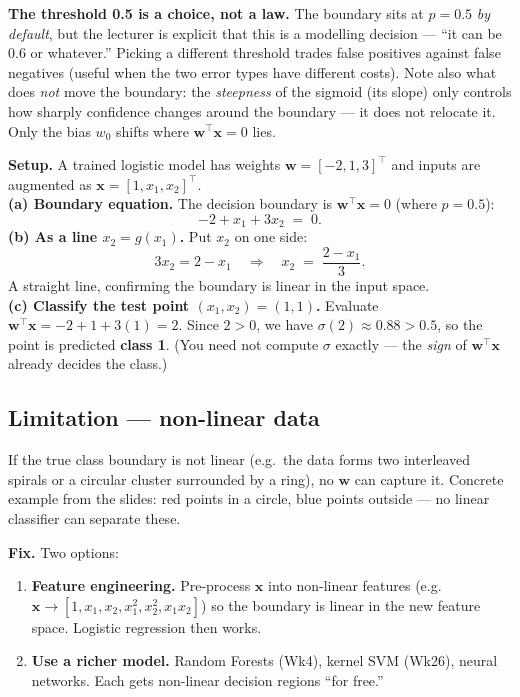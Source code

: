 \documentclass[11pt, a4paper]{article}
\begin{document}
\textbf{The threshold 0.5 is a choice, not a law.} The boundary sits at $p = 0.5$ \emph{by default}, but the lecturer is explicit that this is a modelling decision — ``it can be 0.6 or whatever.'' Picking a different threshold trades false positives against false negatives (useful when the two error types have different costs). Note also what does \emph{not} move the boundary: the \emph{steepness} of the sigmoid (its slope) only controls how sharply confidence changes around the boundary — it does not relocate it. Only the bias $w_0$ shifts where $\mathbf{w}^\top\mathbf{x} = 0$ lies.

\begin{exbox}
\textbf{Setup.} A trained logistic model has weights $\mathbf{w} = [-2, 1, 3]^\top$ and inputs are augmented as $\mathbf{x} = [1, x_1, x_2]^\top$.\\[0.2em]
\textbf{(a) Boundary equation.} The decision boundary is $\mathbf{w}^\top\mathbf{x} = 0$ (where $p = 0.5$):
\[
-2 + x_1 + 3x_2 \;=\; 0.
\]
\textbf{(b) As a line $x_2 = g(x_1)$.} Put $x_2$ on one side:
\[
3x_2 = 2 - x_1 \quad\Longrightarrow\quad x_2 \;=\; \frac{2 - x_1}{3}.
\]
A straight line, confirming the boundary is linear in the input space.\\[0.2em]
\textbf{(c) Classify the test point $(x_1, x_2) = (1, 1)$.} Evaluate $\mathbf{w}^\top\mathbf{x} = -2 + 1 + 3(1) = 2$. Since $2 > 0$, we have $\sigma(2) \approx 0.88 > 0.5$, so the point is predicted \textbf{class 1}. (You need not compute $\sigma$ exactly — the \emph{sign} of $\mathbf{w}^\top\mathbf{x}$ already decides the class.)
\end{exbox}

\subsection{Limitation — non-linear data}

If the true class boundary is not linear (e.g.\ the data forms two interleaved spirals or a circular cluster surrounded by a ring), no $\mathbf{w}$ can capture it. Concrete example from the slides: red points in a circle, blue points outside — no linear classifier can separate these.

\textbf{Fix.} Two options:
\begin{enumerate}
  \item \textbf{Feature engineering.} Pre-process $\mathbf{x}$ into non-linear features (e.g.\ $\mathbf{x}\to[1, x_1, x_2, x_1^2, x_2^2, x_1 x_2]$) so the boundary is linear in the new feature space. Logistic regression then works.
  \item \textbf{Use a richer model.} Random Forests (Wk4), kernel SVM (Wk26), neural networks. Each gets non-linear decision regions ``for free.''
\end{enumerate}
\end{document}
